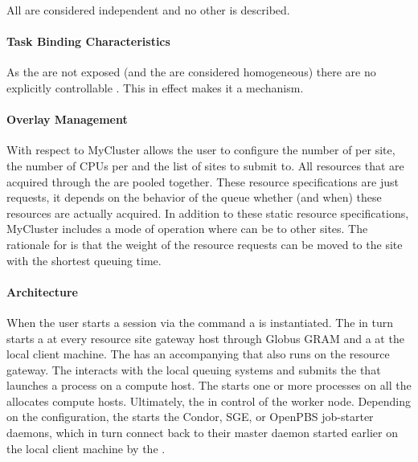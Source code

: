 \documentclass{sig-alternate}
\begin{document}
All  are considered independent and no other  is described.

\paragraph{Task Binding Characteristics}

As the \pilots are not exposed (and the  are considered
homogeneous) there are no explicitly controllable . This in effect makes it a  mechanism.

\paragraph{Overlay Management}

With respect to  MyCluster allows the user to
configure the number of  per site, the number of CPUs per
 and the list of sites to submit to. All resources that are
acquired through the  are pooled together. These
resource specifications are just requests, it depends on the behavior of the
queue whether (and when) these resources are actually acquired. In addition to
these static resource specifications, MyCluster includes a mode of operation
where  can be  to other sites. The rationale
for  is that the weight of the resource requests can be
moved to the site with the shortest queuing time.

\paragraph{Architecture}

When the user starts a session via the  command a
 is instantiated. The  in turn
starts a  at every resource site gateway host through
Globus GRAM and a  at the local client machine.
The  has an accompanying  that
also runs on the resource gateway. The  interacts
with the local queuing systems and submits the  that
launches a  process on a compute host. The  starts one or more  processes on all the
allocates compute hosts. Ultimately, the  in
control of the worker node. Depending on the configuration, the  starts the Condor, SGE, or OpenPBS job-starter daemons, which in
turn connect back to their master daemon started earlier on the local client
machine by the .
\end{document}

